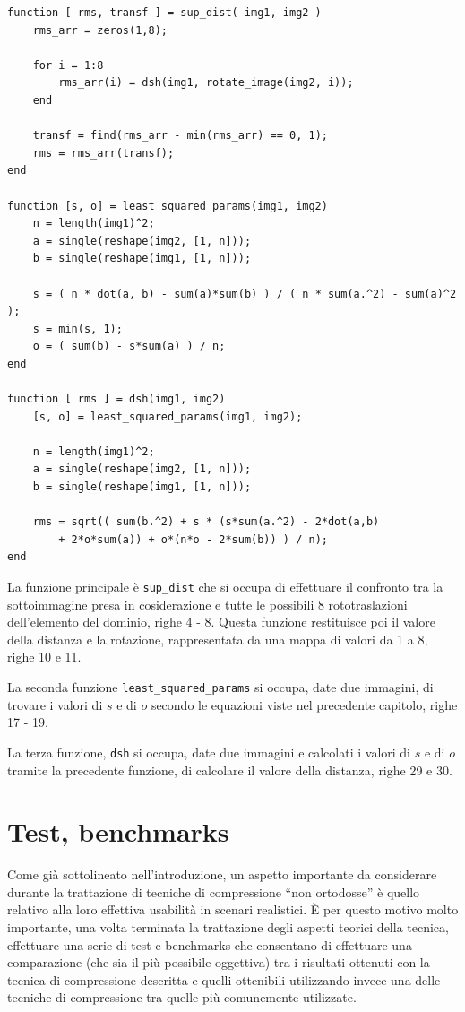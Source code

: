 \documentclass[11pt,a4paper,appendixprefix=true,numbers=noenddot]{scrreprt}
\begin{document}
\begin{verbatim}
function [ rms, transf ] = sup_dist( img1, img2 )
    rms_arr = zeros(1,8);

    for i = 1:8
        rms_arr(i) = dsh(img1, rotate_image(img2, i));
    end

    transf = find(rms_arr - min(rms_arr) == 0, 1);
    rms = rms_arr(transf);
end

function [s, o] = least_squared_params(img1, img2)
    n = length(img1)^2;
    a = single(reshape(img2, [1, n]));
    b = single(reshape(img1, [1, n]));

    s = ( n * dot(a, b) - sum(a)*sum(b) ) / ( n * sum(a.^2) - sum(a)^2 );
    s = min(s, 1);
    o = ( sum(b) - s*sum(a) ) / n;
end

function [ rms ] = dsh(img1, img2)
    [s, o] = least_squared_params(img1, img2);

    n = length(img1)^2;
    a = single(reshape(img2, [1, n]));
    b = single(reshape(img1, [1, n]));

    rms = sqrt(( sum(b.^2) + s * (s*sum(a.^2) - 2*dot(a,b) 
        + 2*o*sum(a)) + o*(n*o - 2*sum(b)) ) / n);
end
\end{verbatim}

La funzione principale è \texttt{sup\_dist} che si occupa di effettuare il confronto tra la sottoimmagine presa in cosiderazione e tutte le possibili 8 rototraslazioni dell'elemento del dominio, righe 4 - 8. Questa funzione restituisce poi il valore della distanza e la rotazione, rappresentata da una mappa di valori da 1 a 8, righe 10 e 11.

La seconda funzione \texttt{least\_squared\_params} si occupa, date due immagini, di trovare i valori di $s$ e di $o$ secondo le equazioni viste nel precedente capitolo, righe 17 - 19.

La terza funzione, \texttt{dsh} si occupa, date due immagini e calcolati i valori di $s$ e di $o$ tramite la precedente funzione, di calcolare il valore della distanza, righe 29 e 30.

\chapter{Test, benchmarks}

Come già sottolineato nell'introduzione, un aspetto importante da considerare durante la trattazione di tecniche di compressione ``non ortodosse'' è quello relativo alla loro effettiva usabilità in scenari realistici. È per questo motivo molto importante, una volta terminata la trattazione degli aspetti teorici della tecnica, effettuare una serie di test e benchmarks che consentano di effettuare una comparazione (che sia il più possibile oggettiva) tra i risultati ottenuti con la tecnica di compressione descritta e quelli ottenibili utilizzando invece una delle tecniche di compressione tra quelle più comunemente utilizzate.
\end{document}
